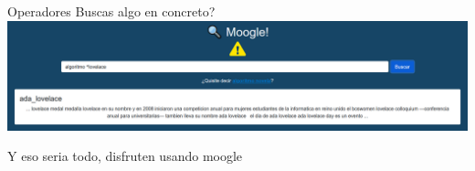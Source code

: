 \documentclass{beamer}
\begin{document}
\begin{frame}{Operadores}
    Buscas algo en concreto?\\
    \includegraphics[scale=0.2]{Imagenes/operator_appear.png}
\end{frame}

\begin{frame}{}
        Y eso seria todo, disfruten usando moogle
\end{frame}
\end{document}
